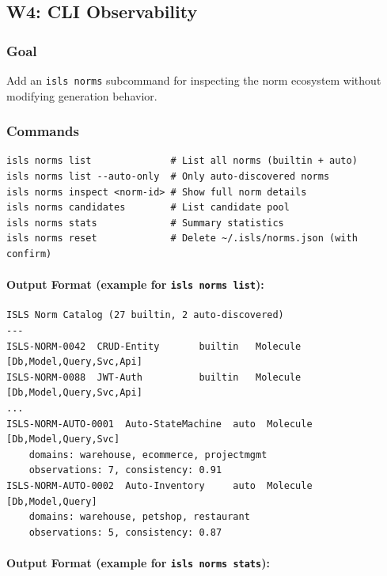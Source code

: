 \documentclass[11pt,a4paper]{article}
\begin{document}
\subsection{W4: CLI Observability}
\label{sec:w4}

\subsubsection{Goal}

Add an \texttt{isls norms} subcommand for inspecting the norm ecosystem 
without modifying generation behavior.

\subsubsection{Commands}

\begin{lstlisting}[style=bash]
isls norms list              # List all norms (builtin + auto)
isls norms list --auto-only  # Only auto-discovered norms
isls norms inspect <norm-id> # Show full norm details
isls norms candidates        # List candidate pool
isls norms stats             # Summary statistics
isls norms reset             # Delete ~/.isls/norms.json (with confirm)
\end{lstlisting}

\paragraph{Output Format (example for \texttt{isls norms list}):}

\begin{lstlisting}[style=bash]
ISLS Norm Catalog (27 builtin, 2 auto-discovered)
---
ISLS-NORM-0042  CRUD-Entity       builtin   Molecule  [Db,Model,Query,Svc,Api]
ISLS-NORM-0088  JWT-Auth          builtin   Molecule  [Db,Model,Query,Svc,Api]
...
ISLS-NORM-AUTO-0001  Auto-StateMachine  auto  Molecule  [Db,Model,Query,Svc]
    domains: warehouse, ecommerce, projectmgmt
    observations: 7, consistency: 0.91
ISLS-NORM-AUTO-0002  Auto-Inventory     auto  Molecule  [Db,Model,Query]
    domains: warehouse, petshop, restaurant
    observations: 5, consistency: 0.87
\end{lstlisting}

\paragraph{Output Format (example for \texttt{isls norms stats}):}
\end{document}
